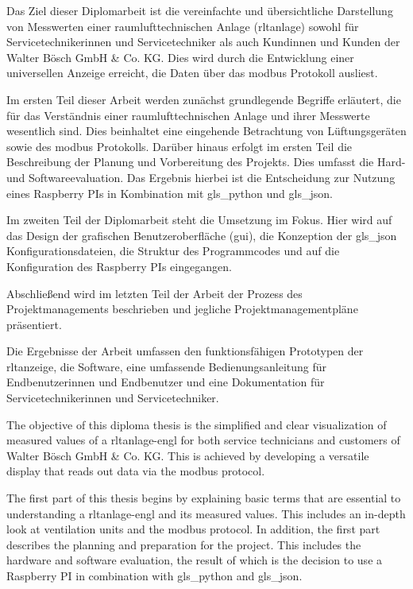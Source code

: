 \noindent Das Ziel dieser Diplomarbeit ist die vereinfachte und übersichtliche Darstellung von Messwerten einer raumlufttechnischen Anlage (\acs{rltanlage}) sowohl für Servicetechnikerinnen und Servicetechniker als auch Kundinnen und Kunden der Walter Bösch GmbH \& Co. KG. Dies wird durch die Entwicklung einer universellen Anzeige erreicht, die Daten über das \gls{modbus} Protokoll ausliest. 

Im ersten Teil dieser Arbeit werden zunächst grundlegende Begriffe erläutert, die für das Verständnis einer raumlufttechnischen Anlage und ihrer Messwerte wesentlich sind. Dies beinhaltet eine eingehende Betrachtung von Lüftungsgeräten sowie des \gls{modbus} Protokolls. Darüber hinaus erfolgt im ersten Teil die Beschreibung der Planung und Vorbereitung des Projekts. Dies umfasst die Hard- und Softwareevaluation. Das Ergebnis hierbei ist die Entscheidung zur Nutzung eines Raspberry PIs in Kombination mit \gls{gls_python} und \gls{gls_json}. 

Im zweiten Teil der Diplomarbeit steht die Umsetzung im Fokus. Hier wird auf das Design der grafischen Benutzeroberfläche (\acs{gui}), die Konzeption der \gls{gls_json} Konfigurationsdateien, die Struktur des Programmcodes und auf die Konfiguration des Raspberry PIs eingegangen. 

Abschließend wird im letzten Teil der Arbeit der Prozess des Projektmanagements beschrieben und jegliche Projektmanagementpläne präsentiert.

Die Ergebnisse der Arbeit umfassen den funktionsfähigen Prototypen der \ac{rltanzeige}, die Software, eine umfassende Bedienungsanleitung für Endbenutzerinnen und Endbenutzer und eine Dokumentation für Servicetechnikerinnen und Servicetechniker.


\noindent The objective of this diploma thesis is the simplified and clear visualization of measured values of a \acf{rltanlage-engl} for both service technicians and customers of Walter Bösch GmbH \& Co. KG. This is achieved by developing a versatile display that reads out data via the \gls{modbus} protocol. 

The first part of this thesis begins by explaining basic terms that are essential to understanding a \ac{rltanlage-engl} and its measured values. This includes an in-depth look at ventilation units and the \gls{modbus} protocol. In addition, the first part describes the planning and preparation for the project. This includes the hardware and software evaluation, the result of which is the decision to use a Raspberry PI in combination with \gls{gls_python} and \gls{gls_json}. 

